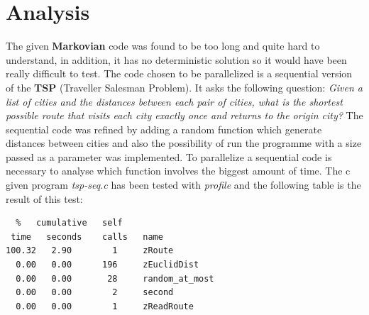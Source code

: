 \documentclass[11pt,conference]{IEEEtran}
\begin{document}
\section{Analysis}
The given \textbf{Markovian} code was found to be too long and quite hard to understand, in addition, it has no deterministic solution so it would have been really difficult to test.
\newline
The code chosen to be parallelized is a sequential version of the \textbf{TSP} (Traveller Salesman Problem). It asks the following question: \textit{Given a list of cities and the distances between each pair of cities, what is the shortest possible route that visits each city exactly once and returns to the origin city?} \cite{citation1}
\newline
The sequential code was refined by adding a random function which generate distances between cities and also the possibility of run the programme with a size passed as a parameter was implemented.
\newline
To parallelize a sequential code is necessary to analyse which function involves the biggest amount of time. The c given program \textit{tsp-seq.c} has been tested with \textit{profile} and the following table is the result of this test:
\begin{lstlisting}
  %   cumulative   self               
 time   seconds    calls   name    
100.32   2.90        1     zRoute
  0.00   0.00      196     zEuclidDist
  0.00   0.00       28     random_at_most
  0.00   0.00        2     second
  0.00   0.00        1     zReadRoute
\end{lstlisting}
\end{document}
